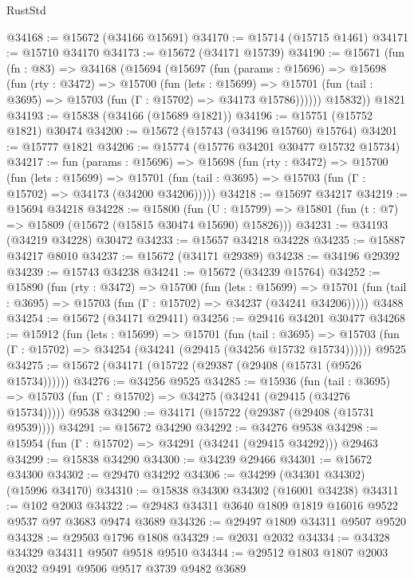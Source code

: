 \begin{lexlean}{RustStd}
\begin{coremodule}
@34168 := @15672 (@34166 @15691)
@34170 := @15714 (@15715 @1461)
@34171 := @15710 @34170
@34173 := @15672 (@34171 @15739)
@34190 := @15671
    (fun (fn : @83) =>
    @34168
      (@15694
        (@15697
          (fun (params : @15696) =>
          @15698
            (fun (rty : @3472) =>
            @15700
              (fun (lets : @15699) =>
              @15701 (fun (tail : @3695) => @15703 (fun (Γ : @15702) => @34173 @15786))))))
        @15832))
    @1821
@34193 := @15838 (@34166 (@15689 @1821))
@34196 := @15751 (@15752 @1821) @30474
@34200 := @15672 (@15743 (@34196 @15760) @15764)
@34201 := @15777 @1821
@34206 := @15774 (@15776 @34201 @30477 @15732 @15734)
@34217 := fun (params : @15696) =>
  @15698
    (fun (rty : @3472) =>
    @15700
      (fun (lets : @15699) =>
      @15701 (fun (tail : @3695) => @15703 (fun (Γ : @15702) => @34173 (@34200 @34206)))))
@34218 := @15697 @34217
@34219 := @15694 @34218
@34228 := @15800
    (fun (U : @15799) => @15801 (fun (t : @7) => @15809 (@15672 (@15815 @30474 @15690) @15826)))
@34231 := @34193 (@34219 @34228) @30472
@34233 := @15657 @34218 @34228
@34235 := @15887 @34217 @8010
@34237 := @15672 (@34171 @29389)
@34238 := @34196 @29392
@34239 := @15743 @34238
@34241 := @15672 (@34239 @15764)
@34252 := @15890
    (fun (rty : @3472) =>
    @15700
      (fun (lets : @15699) =>
      @15701 (fun (tail : @3695) => @15703 (fun (Γ : @15702) => @34237 (@34241 @34206)))))
    @3488
@34254 := @15672 (@34171 @29411)
@34256 := @29416 @34201 @30477
@34268 := @15912
    (fun (lets : @15699) =>
    @15701
      (fun (tail : @3695) =>
      @15703 (fun (Γ : @15702) => @34254 (@34241 (@29415 (@34256 @15732 @15734))))))
    @9525
@34275 := @15672 (@34171 (@15722 (@29387 (@29408 (@15731 (@9526 @15734))))))
@34276 := @34256 @9525
@34285 := @15936
    (fun (tail : @3695) => @15703 (fun (Γ : @15702) => @34275 (@34241 (@29415 (@34276 @15734)))))
    @9538
@34290 := @34171 (@15722 (@29387 (@29408 (@15731 @9539))))
@34291 := @15672 @34290
@34292 := @34276 @9538
@34298 := @15954 (fun (Γ : @15702) => @34291 (@34241 (@29415 @34292))) @29463
@34299 := @15838 @34290
@34300 := @34239 @29466
@34301 := @15672 @34300
@34302 := @29470 @34292
@34306 := @34299 (@34301 @34302) (@15996 @34170)
@34310 := @15838 @34300 @34302 (@16001 @34238)
@34311 := @102 @2003
@34322 := @29483 @34311 @3640 @1809 @1819 @16016 @9522 @9537 @97 @3683 @9474 @3689
@34326 := @29497 @1809 @34311 @9507 @9520
@34328 := @29503 @1796 @1808
@34329 := @2031 @2032
@34334 := @34328 @34329 @34311 @9507 @9518 @9510
@34344 := @29512 @1803 @1807 @2003 @2032 @9491 @9506 @9517 @3739 @9482 @3689

\end{coremodule}
\end{lexlean}
